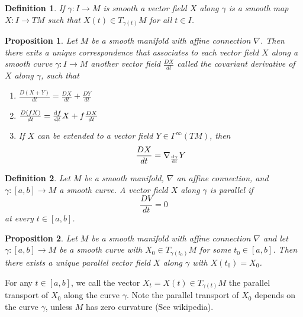 \documentclass[a4paper]{article}
\newtheorem*{prop}{Proposition}
\newtheorem*{defn}{Definition}
\begin{document}
\begin{defn}
  If $\gamma: I \rightarrow M$ is smooth a vector field $X$ along $\gamma$ is a smooth map $X: I \rightarrow TM$ such that $X(t) \in T_{\gamma(t)}M$ for all $t \in I$.
\end{defn}

\begin{prop}
  Let $M$ be a smooth manifold with affine connection $\nabla$. Then there exits a unique correspondence that associates to each vector field $X$ along a smooth curve $\gamma: I \rightarrow M$ another vector field $ \frac{DX}{dt}$ called the covariant derivative of $X$ along $\gamma$, such that
  \begin{enumerate}
    \item $\frac{D(X + Y)}{dt} = \frac{DX}{dt} + \frac{DY}{dt}$
    \item $\frac{D(fX)}{dt} = \dv{f}{t} X + f \frac{DX}{dt}$
    \item If $X$ can be extended to a vector field $Y \in \Gamma^{\infty}(TM)$, then 
      \[
        \frac{DX}{dt} = \nabla_{\dv{\gamma}{t}} Y
      \]
  \end{enumerate}
\end{prop}

\begin{defn}
  Let $M$ be a smooth manifold, $\nabla$ an affine connection, and $\gamma: [a,b] \rightarrow M$ a smooth curve. A vector field $X$ along $\gamma$ is parallel if 
  \[
    \frac{DV}{dt} = 0
  \]
  at every $t \in [a,b]$.
\end{defn}

\begin{prop}
  Let $M$ be a smooth manifold with affine connection $\nabla$ and let $\gamma: [a,b] \rightarrow M$ be a smooth curve with $X_0 \in T_{\gamma(t_0)}M$ for some $t_0 \in [a,b]$. Then there exists a unique parallel vector field $X$ along $\gamma$ with $X(t_0) = X_0$.
\end{prop}

For any $t \in [a,b]$, we call the vector $X_t = X(t) \in T_{\gamma(t)}M$ the parallel transport  of $X_0$ along the curve $\gamma$. Note the parallel transport of $X_0$ depends on the curve $\gamma$, unless $M$ has zero curvature (See wikipedia). 
\end{document}
